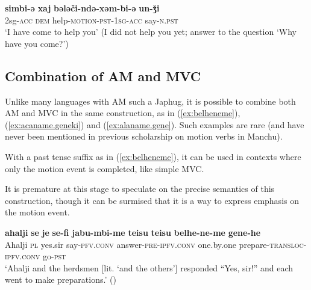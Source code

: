\documentclass{article}
\newcommand{\ipa}[1]{\textbf{{\phon\mbox{#1}}}} %
\begin{document}
\begin{exe}
\ex \label{ex:bElEcindE}
\gll 
\ipa{simbi-ə} \ipa{xaj} \ipa{bələči-ndə-xəm-bi-ə} \ipa{un-ǯi} \\
2sg-\textsc{acc} \textsc{dem} help-\textsc{motion-pst-1sg-acc} say-\textsc{n.pst} \\
\glt  `I have come to help you' (I did not help you yet; answer to the question `Why have you come?')
 \end{exe}

\subsection{Combination of AM and MVC}
Unlike many languages with AM such a Japhug, it is possible to combine both AM and MVC in the same construction, as in (\ref{ex:belheneme}), (\ref{ex:acaname.geneki}) and (\ref{ex:alaname.gene}). Such examples are rare (and have never been mentioned in previous scholarship on motion verbs in Manchu). 

With a past tense suffix as in (\ref{ex:belheneme}), it can be used in contexts where only the motion event is completed, like simple MVC. 

It is premature at this stage to speculate on the precise semantics of this construction, though it can be surmised that it is a way to express emphasis on the motion event.

\begin{exe}
\ex \label{ex:belheneme}
\gll 
\ipa{ahalji} 	\ipa{se} 	\ipa{je} 	\ipa{se-fi} 	\ipa{jabu-mbi-me} 	{\ipa{teisu} \ipa{teisu}} 	\ipa{belhe-ne-me} 	\ipa{gene-he} \\
Ahalji \textsc{pl} yes.sir say-\textsc{pfv.conv} answer-\textsc{pre-ipfv.conv} one.by.one prepare-\textsc{transloc-ipfv.conv} go-\textsc{pst} \\
\glt ‘Ahalji and the herdsmen [lit. ‘and the others’] responded “Yes, sir!” and each went to make preparations.’ (\citealt[14/45]{nowak77nisan})
\end{exe} 

\end{document}
